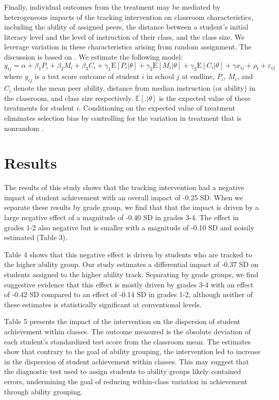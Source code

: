\documentclass[12pt]{article}
\begin{document}
Finally, individual outcomes from the treatment may be mediated by heterogeneous impacts of the tracking intervention on classroom characteristics, including the ability of assigned peers, the distance between a student's initial literacy level and the level of instruction of their class, and the class size. We leverage variation in these characteristics arising from random assignment. The discussion is based on \cite{angrist/gray-lobe/idoux/pathak:2022}. We estimate the following model:
 \[ y_{ij} = \alpha + \beta_1 P_i + \beta_2 M_i + \beta_3 C_i + \gamma_1\text{E}[P_i|\theta]  + \gamma_2\text{E}[M_i|\theta]  + \gamma_3 \text{E}[C_i| \theta]  + \gamma x_{ij}  + \rho_t +  \varepsilon_{ij}  \]
where $y_{ij}$ is a test score outcome of student $i$ in school $j$ at endline, $P_i$, $M_i$, and $C_i$ denote the mean peer ability, distance from median instruction (or ability) in the classroom, and class size respectively. $\mathbb{E}[. | \theta]$ is the expected value of these treatments for student $i$. Conditioning on the expected value of treatment eliminates selection bias by controlling for the variation in treatment that is nonrandom \citep{borusyak2020non, hirano2004propensity, rosenbaum1983central}.

\section*{Results}
\label{sec:results}

The results of this study shows that the tracking intervention had a negative impact of student achievement with an overall impact of -0.25 SD. When we separate these results by grade group, we find that that the impact is driven by a large negative effect of a magnitude of -0.40 SD in grades 3-4. The effect in grades 1-2 also negative but is smaller with a magnitude of -0.10 SD and noisily estimated (Table 3).

Table 4 shows that this negative effect is driven by students who are tracked to the higher ability group. Our study estimates a differential impact of -0.37 SD on students assigned to the higher ability track. Separating by grade groups, we find suggestive evidence that this effect is mostly driven by grades 3-4 with an effect of -0.42 SD compared to an effect of -0.14 SD in grades 1-2, although neither of these estimates is statistically significant at conventional levels. 

Table 5 presents the impact of the intervention on the dispersion of student achievement within classes. The outcome measured is the absolute deviation of each student's standardized test score from the classroom mean. The estimates show that contrary to the goal of ability grouping, the intervention led to increase in the dispersion of student achievement within classes. This may suggest that the diagnostic test used to assign students to ability groups likely contained errors, undermining the goal of reducing within-class variation in achievement through ability grouping.
\end{document}
